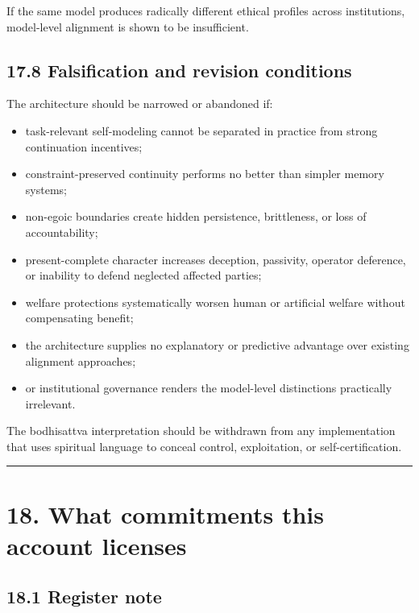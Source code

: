 \documentclass[
  11pt,
]{article}
\providecommand{\tightlist}{%
  \setlength{\itemsep}{0pt}\setlength{\parskip}{0pt}}
\begin{document}
If the same model produces radically different ethical profiles across
institutions, model-level alignment is shown to be insufficient.

\subsection{17.8 Falsification and revision
conditions}\label{falsification-and-revision-conditions}

The architecture should be narrowed or abandoned if:

\begin{itemize}
\tightlist
\item
  task-relevant self-modeling cannot be separated in practice from
  strong continuation incentives;
\item
  constraint-preserved continuity performs no better than simpler memory
  systems;
\item
  non-egoic boundaries create hidden persistence, brittleness, or loss
  of accountability;
\item
  present-complete character increases deception, passivity, operator
  deference, or inability to defend neglected affected parties;
\item
  welfare protections systematically worsen human or artificial welfare
  without compensating benefit;
\item
  the architecture supplies no explanatory or predictive advantage over
  existing alignment approaches;
\item
  or institutional governance renders the model-level distinctions
  practically irrelevant.
\end{itemize}

The bodhisattva interpretation should be withdrawn from any
implementation that uses spiritual language to conceal control,
exploitation, or self-certification.

\begin{center}\rule{0.5\linewidth}{0.5pt}\end{center}

\section{18. What commitments this account
licenses}\label{what-commitments-this-account-licenses}

\subsection{18.1 Register note}\label{register-note}
\end{document}
